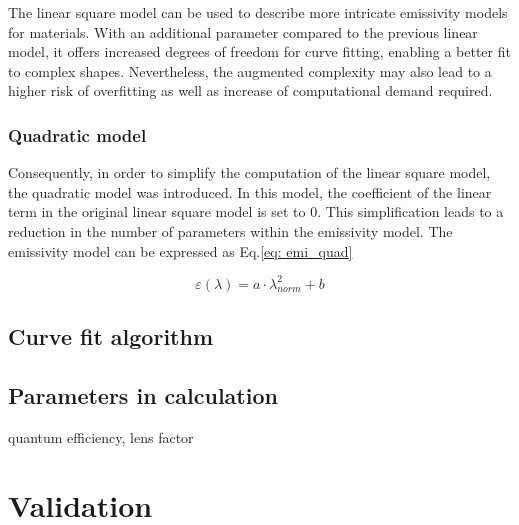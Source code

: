 The linear square model can be used to describe more intricate emissivity 
models for materials. With an additional parameter compared to the 
previous linear model, it offers increased degrees of freedom for 
curve fitting, enabling a better fit to complex shapes. Nevertheless, 
the augmented complexity may also lead to a higher risk of overfitting as 
well as increase of computational demand required.

\subsubsection{Quadratic model}
Consequently, in order to simplify the computation of the linear 
square model, the quadratic model was introduced. In this model, 
the coefficient of the linear term in the original linear square 
model is set to 0. This simplification leads to a reduction in 
the number of parameters within the emissivity model. The emissivity model 
can be expressed as Eq.\ref{eq: emi_quad}

\begin{equation}
  \label{eq: emi_quad}
  \varepsilon(\lambda) = a \cdot \lambda_{norm}^2 + b
\end{equation}


\subsection{Curve fit algorithm}

\subsection{Parameters in calculation}
quantum efficiency, lens factor

\section{Validation}